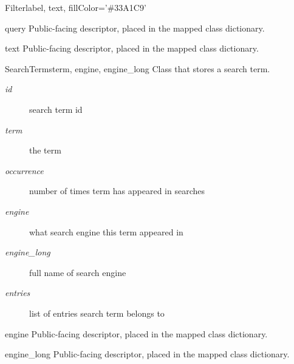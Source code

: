 \documentclass[letterpaper,10pt,english]{manual}
\begin{document}
\begin{classdesc}{Filter}{label, text, fillColor='\#33A1C9'}
\hypertarget{webscavator.model.models.Filter.query}{}\begin{memberdesc}{query}
Public-facing descriptor, placed in the mapped class dictionary.
\end{memberdesc}

\hypertarget{webscavator.model.models.Filter.text}{}\begin{memberdesc}{text}
Public-facing descriptor, placed in the mapped class dictionary.
\end{memberdesc}
\end{classdesc}

\hypertarget{webscavator.model.models.SearchTerms}{}\begin{classdesc}{SearchTerms}{term, engine, engine\_long}
Class that stores a search term.
\begin{description}
\item[\emph{id}]
search term id

\item[\emph{term}]
the term

\item[\emph{occurrence}]
number of times term has appeared in searches

\item[\emph{engine}]
what search engine this term appeared in

\item[\emph{engine\_long}]
full name of search engine

\item[\emph{entries}]
list of entries search term belongs to

\end{description}

\hypertarget{webscavator.model.models.SearchTerms.engine}{}\begin{memberdesc}{engine}
Public-facing descriptor, placed in the mapped class dictionary.
\end{memberdesc}

\hypertarget{webscavator.model.models.SearchTerms.engine_long}{}\begin{memberdesc}{engine\_long}
Public-facing descriptor, placed in the mapped class dictionary.
\end{memberdesc}


\end{classdesc}
\end{document}
